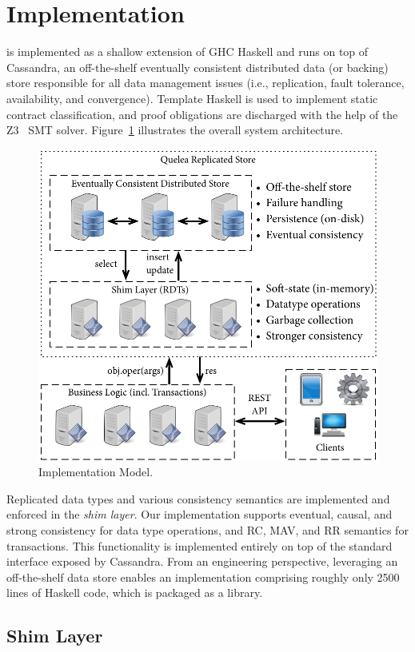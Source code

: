 \section{Implementation}
\label{sec:impl}

\name is implemented as a shallow extension of GHC Haskell and runs on top of
Cassandra, an off-the-shelf eventually consistent distributed data (or backing)
store responsible for all data management issues (i.e., replication, fault
tolerance, availability, and convergence).  Template Haskell is used to
implement static contract classification, and proof obligations are discharged
with the help of the Z3~\cite{Z3} SMT solver. Figure~\ref{fig:impl_mod}
illustrates the overall system architecture.

\begin{figure}
\begin{center}
\includegraphics[width=0.7\columnwidth]{Figures/ImplModel}
\end{center}
\caption{Implementation Model.}
\label{fig:impl_mod}
\end{figure}

Replicated data types and various consistency semantics are implemented and
enforced in the \emph{shim layer}. Our implementation supports eventual,
causal, and strong consistency for data type operations, and RC, MAV, and RR
semantics for transactions.  This functionality is implemented entirely on
top of the standard interface exposed by Cassandra. From an engineering
perspective, leveraging an off-the-shelf data store enables an
implementation comprising roughly only 2500 lines of Haskell code, which is
packaged as a library.

\subsection{Shim Layer}

